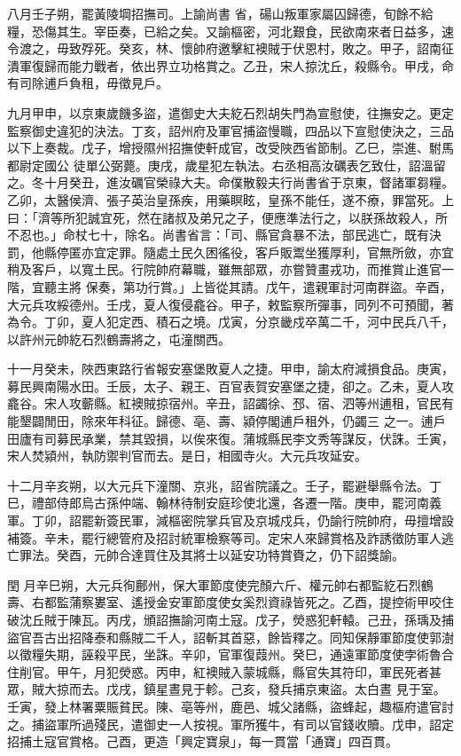\begin{pinyinscope}
 八月壬子朔，罷黃陵堈招撫司。上諭尚書
 省，碭山叛軍家屬囚歸德，旬餘不給糧，恐傷其生。宰臣奏，已給之矣。又諭樞密，河北艱食，民欲南來者日益多，速令渡之，毋致殍死。癸亥，林、懷帥府邀擊紅襖賊于伏恩村，敗之。甲子，詔南征潰軍復歸而能力戰者，依出界立功格賞之。乙丑，宋人掠沈丘，殺縣令。甲戌，命有司除逋戶負租，毋徵見戶。



 九月甲申，以京東歲饑多盜，遣御史大夫紇石烈胡失門為宣慰使，往撫安之。更定監察御史違犯的決法。丁亥，詔州府及軍官捕盜慢職，四品以下宣慰使決之，三品以下上奏裁。戊子，增授隰州招撫使軒成官，改受陜西省節制。乙巳，崇進、駙馬都尉定國公
 徒單公弼薨。庚戌，歲星犯左執法。右丞相高汝礪表乞致仕，詔溫留之。冬十月癸丑，進汝礪官榮祿大夫。命僕散毅夫行尚書省于京東，督諸軍芻糧。乙卯，太醫侯濟、張子英治皇孫疾，用藥瞑眩，皇孫不能任，遂不療，罪當死。上曰：「濟等所犯誠宜死，然在諸叔及弟兄之子，便應準法行之，以朕孫故殺人，所不忍也。」命杖七十，除名。尚書省言：「司、縣官貪暴不法，部民逃亡，既有決罰，他縣停匿亦宜定罪。隨處土民久困徭役，客戶販鬻坐獲厚利，官無所斂，亦宜稍及客戶，以寬土民。行院帥府幕職，雖無部眾，亦嘗贊畫戎功，而推賞止進官一階，宜聽主將
 保奏，第功行賞。」上皆從其請。戊午，遣親軍討河南群盜。辛酉，大元兵攻綏德州。壬戌，夏人復侵龕谷。甲子，敕監察所彈事，同列不可預聞，著為令。丁卯，夏人犯定西、積石之境。戊寅，分京畿戍卒萬二千，河中民兵八千，以許州元帥紇石烈鶴壽將之，屯潼關西。



 十一月癸未，陜西東路行省報安塞堡敗夏人之捷。甲申，諭太府減損食品。庚寅，募民興南陽水田。壬辰，太子、親王、百官表賀安塞堡之捷，卻之。乙未，夏人攻龕谷。宋人攻蘄縣。紅襖賊掠宿州。辛丑，詔蠲徐、邳、宿、泗等州逋租，官民有能墾闢閒田，除來年科征。歸德、亳、壽、潁停閣逋戶租外，仍蠲三
 之一。逋戶田廬有司募民承業，禁其毀損，以俟來復。蒲城縣民李文秀等謀反，伏誅。壬寅，宋人焚潁州，執防禦判官而去。是日，相國寺火。大元兵攻延安。



 十二月辛亥朔，以大元兵下潼關、京兆，詔省院議之。壬子，罷避舉縣令法。丁巳，禮部侍郎烏古孫仲端、翰林待制安庭珍使北還，各遷一階。庚申，罷河南義軍。丁卯，詔罷新簽民軍，減樞密院掌兵官及京城戍兵，仍諭行院帥府，毋擅增設補簽。辛未，罷行總管府及招討統軍檢察等司。定宋人來歸賞格及詐誘徵防軍人逃亡罪法。癸酉，元帥合達買住及其將士以延安功特賞賚之，仍下詔獎諭。



 閏
 月辛巳朔，大元兵徇鄜州，保大軍節度使完顏六斤、權元帥右都監紇石烈鶴壽、右都監蒲察婁室、遙授金安軍節度使女奚烈資祿皆死之。乙酉，提控術甲咬住破沈丘賊于陳瓦。丙戌，頒詔撫諭河南土寇。戊子，熒惑犯軒轅。己丑，孫瑀及捕盜官吾古出招降泰和縣賊二千人，詔斬其首惡，餘皆釋之。同知保靜軍節度使郭澍以徵糧失期，誣殺平民，坐誅。辛卯，官軍復葭州。癸巳，通遠軍節度使孛術魯合住削官。甲午，月犯熒惑。丙申，紅襖賊入蒙城縣，縣官失其符印，軍民死者甚眾，賊大掠而去。戊戌，鎮星晝見于軫。己亥，發兵捕京東盜。太白晝
 見于室。壬寅，發上林署粟賑貧民。陳、亳等州，鹿邑、城父諸縣，盜蜂起，趣樞府遣官討之。捕盜軍所過殘民，遣御史一人按視。軍所獲牛，有司以官錢收贖。戊申，詔定招捕土寇官賞格。己酉，更造「興定寶泉」，每一貫當「通寶」四百貫。




\end{pinyinscope}
